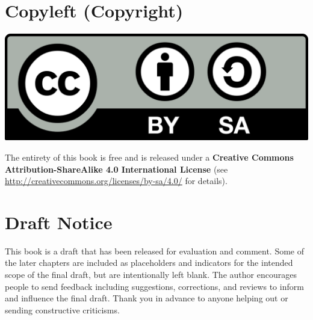 \documentclass[12pt]{scrbook}
\begin{document}


\frontmatter

\chapter{Copyleft (Copyright)}

\includegraphics[scale=0.10]{images/CC-BY-SA_icon-large.png} 

The entirety of this book is free and is released under a \textbf{Creative Commons Attribution-ShareAlike 
4.0 International License} (see \url{http://creativecommons.org/licenses/by-sa/4.0/} for details).

\chapter{Draft Notice}

This book is a draft that has been released for evaluation and comment.  
Some of the later chapters are included as placeholders and indicators 
for the intended scope of the final draft, but are intentionally
left blank.  The author encourages people to send feedback including 
suggestions, corrections, and reviews to inform and influence the final 
draft.  Thank you in advance to anyone helping out or sending 
constructive criticisms.
\end{document}
